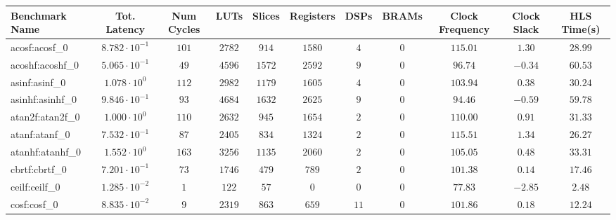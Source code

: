 \begin{tabular}{|l|c|c|c|c|c|c|c|c|c|c|}
\hline
Benchmark Name               & Tot. Latency            & Num Cycles & LUTs      & Slices    & Registers & DSPs    & BRAMs & Clock Frequency & Clock Slack & HLS Time(s) \\
\hline
acosf:acosf\_0               & $ 8.782 \cdot 10^{-1} $ & $ 101    $ & $ 2782  $ & $ 914   $ & $ 1580  $ & $ 4   $ & $ 0 $ & $ 115.01      $ & $ 1.30    $ & $ 28.99   $ \\
acoshf:acoshf\_0             & $ 5.065 \cdot 10^{-1} $ & $ 49     $ & $ 4596  $ & $ 1572  $ & $ 2592  $ & $ 9   $ & $ 0 $ & $ 96.74       $ & $ -0.34   $ & $ 60.53   $ \\
asinf:asinf\_0               & $ 1.078 \cdot 10^{0}  $ & $ 112    $ & $ 2982  $ & $ 1179  $ & $ 1605  $ & $ 4   $ & $ 0 $ & $ 103.94      $ & $ 0.38    $ & $ 30.24   $ \\
asinhf:asinhf\_0             & $ 9.846 \cdot 10^{-1} $ & $ 93     $ & $ 4684  $ & $ 1632  $ & $ 2625  $ & $ 9   $ & $ 0 $ & $ 94.46       $ & $ -0.59   $ & $ 59.78   $ \\
atan2f:atan2f\_0             & $ 1.000 \cdot 10^{0}  $ & $ 110    $ & $ 2632  $ & $ 945   $ & $ 1654  $ & $ 2   $ & $ 0 $ & $ 110.00      $ & $ 0.91    $ & $ 31.33   $ \\
atanf:atanf\_0               & $ 7.532 \cdot 10^{-1} $ & $ 87     $ & $ 2405  $ & $ 834   $ & $ 1324  $ & $ 2   $ & $ 0 $ & $ 115.51      $ & $ 1.34    $ & $ 26.27   $ \\
atanhf:atanhf\_0             & $ 1.552 \cdot 10^{0}  $ & $ 163    $ & $ 3256  $ & $ 1135  $ & $ 2060  $ & $ 2   $ & $ 0 $ & $ 105.05      $ & $ 0.48    $ & $ 33.31   $ \\
cbrtf:cbrtf\_0               & $ 7.201 \cdot 10^{-1} $ & $ 73     $ & $ 1746  $ & $ 479   $ & $ 789   $ & $ 2   $ & $ 0 $ & $ 101.38      $ & $ 0.14    $ & $ 17.46   $ \\
ceilf:ceilf\_0               & $ 1.285 \cdot 10^{-2} $ & $ 1      $ & $ 122   $ & $ 57    $ & $ 0     $ & $ 0   $ & $ 0 $ & $ 77.83       $ & $ -2.85   $ & $ 2.48    $ \\
cosf:cosf\_0                 & $ 8.835 \cdot 10^{-2} $ & $ 9      $ & $ 2319  $ & $ 863   $ & $ 659   $ & $ 11  $ & $ 0 $ & $ 101.86      $ & $ 0.18    $ & $ 12.24   $ \\

\end{tabular}
